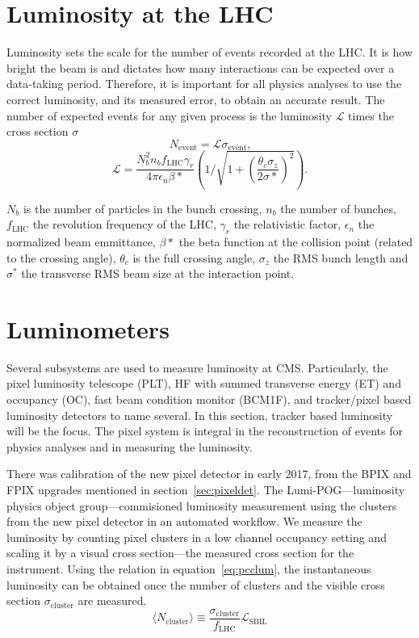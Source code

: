 \section{Luminosity at the LHC}
Luminosity sets the scale for the number of events recorded at the LHC. It is how bright the beam is and dictates how many interactions can be expected over a data-taking period. Therefore, it is important for all physics analyses to use the correct luminosity, and its measured error, to obtain an accurate result. The number of expected events for any given process is the luminosity $\mathcal{L}$ times the cross section $\sigma$  
\begin{equation}
N_{\text{event}} = \mathcal{L} \sigma_{\text{event}} \text{,}
\end{equation}
\begin{equation}
\mathcal{L} = \frac{N_b^2 n_b f_\text{LHC} \gamma_r}{4\pi\epsilon_n \beta*}\left( 1 / \sqrt{1+ (\frac{\theta_c \sigma_z}{2\sigma*})^2} \right)\text{.}
\end{equation}

$N_b$ is the number of particles in the bunch crossing, $n_b$ the number of bunches, $f_{\text{LHC}}$ the revolution frequency of the LHC, $\gamma_r$ the relativistic factor, $\epsilon_n$ the normalized beam emmittance, $\beta*$ the beta function at the collision point (related to the crossing angle), $\theta_c$ is the full crossing angle, $\sigma_z$ the RMS bunch length and $\sigma^*$ the transverse RMS beam size at the interaction point.

\section{Luminometers}
Several subsystems are used to measure luminosity at CMS. Particularly, the pixel luminosity telescope (PLT), HF with summed transverse energy (ET) and occupancy (OC), fast beam condition monitor (BCM1F), and tracker/pixel based luminosity detectors to name several. 
In this section, tracker based luminosity will be the focus. The pixel system is integral in the reconstruction of events for physics analyses and in measuring the luminosity.

There was calibration of the new pixel detector in early 2017, from the BPIX and FPIX upgrades mentioned in section~\ref{sec:pixeldet}. The Lumi-POG---luminosity physics object group---commisioned luminosity measurement using the clusters from the new pixel detector in an automated workflow. 
We measure the luminosity by counting pixel clusters in a low channel occupancy setting and scaling it by a visual cross section---the measured cross section for the instrument. Using the relation in equation~\ref{eq:pcclum}, the instantaneous luminosity can be obtained once the number of clusters and the visible cross section $\sigma_\text{cluster}$ are measured. 
\begin{equation}
\label{eq:pcclum}
\langle N_{\text{cluster}}\rangle\equiv\frac{\sigma_{\text{cluster}}}{f_{\text{LHC}}}\mathcal{L}_{\text{SBIL}}
\end{equation}


